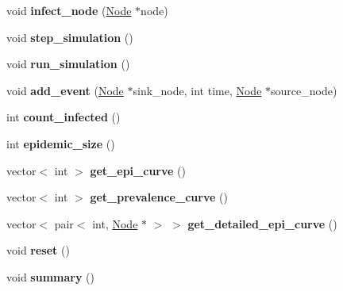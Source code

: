 \begin{DoxyCompactItemize}
\item 
\hypertarget{classChainBinomial__Sim_a3c4c019ab2f85962c28fe3dd85ee08ef}{}void {\bfseries infect\+\_\+node} (\hyperlink{classNode}{Node} $\ast$node)\label{classChainBinomial__Sim_a3c4c019ab2f85962c28fe3dd85ee08ef}

\item 
\hypertarget{classChainBinomial__Sim_affb5dba83fcb57724462b56fb0695ce0}{}void {\bfseries step\+\_\+simulation} ()\label{classChainBinomial__Sim_affb5dba83fcb57724462b56fb0695ce0}

\item 
\hypertarget{classChainBinomial__Sim_a1dc4e4eedec788c0d783fbb8b6a70308}{}void {\bfseries run\+\_\+simulation} ()\label{classChainBinomial__Sim_a1dc4e4eedec788c0d783fbb8b6a70308}

\item 
\hypertarget{classChainBinomial__Sim_a8d62910cfad67fe05f3a5de667ed6f9b}{}void {\bfseries add\+\_\+event} (\hyperlink{classNode}{Node} $\ast$sink\+\_\+node, int time, \hyperlink{classNode}{Node} $\ast$source\+\_\+node)\label{classChainBinomial__Sim_a8d62910cfad67fe05f3a5de667ed6f9b}

\item 
\hypertarget{classChainBinomial__Sim_aea23cd4cc94a78132e16c0eefcd70c71}{}int {\bfseries count\+\_\+infected} ()\label{classChainBinomial__Sim_aea23cd4cc94a78132e16c0eefcd70c71}

\item 
\hypertarget{classChainBinomial__Sim_afd59eb923a3c287787d914fc7d77c60f}{}int {\bfseries epidemic\+\_\+size} ()\label{classChainBinomial__Sim_afd59eb923a3c287787d914fc7d77c60f}

\item 
\hypertarget{classChainBinomial__Sim_a837114b07c1655f241db8e31190289f6}{}vector$<$ int $>$ {\bfseries get\+\_\+epi\+\_\+curve} ()\label{classChainBinomial__Sim_a837114b07c1655f241db8e31190289f6}

\item 
\hypertarget{classChainBinomial__Sim_ac9d248964bc52237ae9698a0e1ca40af}{}vector$<$ int $>$ {\bfseries get\+\_\+prevalence\+\_\+curve} ()\label{classChainBinomial__Sim_ac9d248964bc52237ae9698a0e1ca40af}

\item 
\hypertarget{classChainBinomial__Sim_a5e475fcdaca86cb4467f4c17e3240217}{}vector$<$ pair$<$ int, \hyperlink{classNode}{Node} $\ast$ $>$ $>$ {\bfseries get\+\_\+detailed\+\_\+epi\+\_\+curve} ()\label{classChainBinomial__Sim_a5e475fcdaca86cb4467f4c17e3240217}

\item 
\hypertarget{classChainBinomial__Sim_ad3be9818d5389bd0b507248454968a2a}{}void {\bfseries reset} ()\label{classChainBinomial__Sim_ad3be9818d5389bd0b507248454968a2a}

\item 
\hypertarget{classChainBinomial__Sim_abbdf731e6bdb9af8f17eac392ba81a6f}{}void {\bfseries summary} ()\label{classChainBinomial__Sim_abbdf731e6bdb9af8f17eac392ba81a6f}

\end{DoxyCompactItemize}
